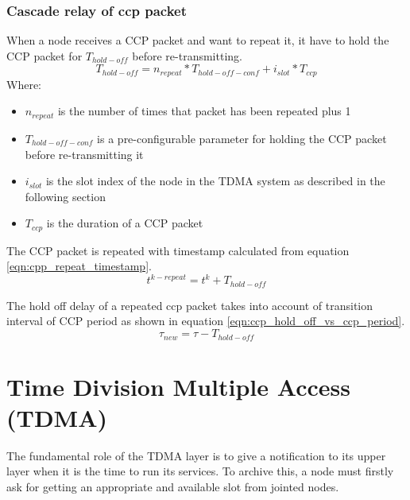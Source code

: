 \documentclass[\main/thesis.tex]{subfiles}
\begin{document}
\subsubsection{Cascade relay of ccp packet}
When a node receives a CCP packet and want to repeat it, it have to hold the CCP packet for $T_{hold-off}$ before re-transmitting.
\begin{equation}
    T_{hold-off} = n_{repeat}*T_{hold-off-conf} + i_{slot}*T_{ccp}
\end{equation}
Where:
\begin{itemize}
    \item $n_{repeat}$ is the number of times that packet has been repeated plus 1
    \item $T_{hold-off-conf}$ is a pre-configurable parameter for holding the CCP packet before re-transmitting it
    \item $i_{slot}$ is the slot index of the node in the TDMA system as described in the following section
    \item  $T_{ccp}$ is the duration of a CCP packet
\end{itemize}

The CCP packet is repeated with timestamp calculated from equation \ref{eqn:cpp_repeat_timestamp}.
\begin{equation}
    t^{k-repeat} = t^k + T_{hold-off}
    \label{eqn:cpp_repeat_timestamp}
\end{equation}

The hold off delay of a repeated ccp packet takes into account of transition interval of CCP period as shown in equation \ref{eqn:ccp_hold_off_vs_ccp_period}.
\begin{equation}
    \tau_{new} = \tau - T_{hold-off}
    \label{eqn:ccp_hold_off_vs_ccp_period}
\end{equation}

\section{Time Division Multiple Access (TDMA)}
The fundamental role of the TDMA layer is to give a notification to its upper layer when it is the time to run its services. To archive this, a node must firstly ask for getting an appropriate and available slot from jointed nodes.
\end{document}

